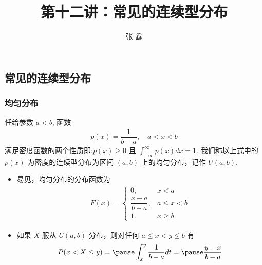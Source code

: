 \documentclass[Prob-All.tex]{subfiles}
\begin{document}
\title[概率论]{第十二讲：常见的连续型分布}
\author [张鑫 {\rm Email: xzhangseu@seu.edu.cn} ]{\large 张 鑫}
\date{}


{ 
	\begin{frame}
		\titlepage
	\end{frame}
}

\addtocounter{framenumber}{-3}  %
\subsection{常见的连续型分布}
\begin{frame}
	\frametitle{均匀分布}
	\begin{defi}
		任给参数 $a<b$, 函数
		\begin{eqnarray*}
			p(x)=\dfrac{1}{b-a}, \quad a<x<b
		\end{eqnarray*}
		满足密度函数的两个性质即:$p (x)\ge 0$ 且 $\int_{-\infty}^\infty p (x) dx=1$. 我们称以上式中的 $p (x)$ 为密度的连续型分布为区间 $(a,b)$ 上的均匀分布，记作 $U (a,b)$.
	\end{defi}
	\pause

	\begin{itemize}[<+-|alert@+>]
		\item 易见，均匀分布的分布函数为
		      \begin{eqnarray*}
			      F(x)=\left\{
			      \begin{array}{ll}
				      0,                & x<a       \\
				      \dfrac{x-a}{b-a}, & a\leq x<b \\
				      1.                & x\ge b
			      \end{array}
			      \right.
		      \end{eqnarray*}
		\item 如果 $X$ 服从 $U (a,b)$ 分布，则对任何 $a\le x<y\le b$ 有
		      \begin{eqnarray*}
			      P(x<X\le y)=\pause \int_x^y\dfrac{1}{b-a}dt=\pause \dfrac{y-x}{b-a}
		      \end{eqnarray*}

	\end{itemize}

\end{frame}
\end{document}

